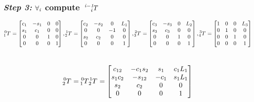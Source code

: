 \documentclass[10pt]{article}
\begin{document}
\subsubsection*{\textit{\textbf{Step 3: }}$\bf{\it{\forall_{i}}}$ compute $\bf{\it{ \tensor*[^{i-1}_{i}]{T}{}}}$}
\[
\tensor*[^{0}_{1}]{T}{} =
\begin{bmatrix}
    c_{1}        & -s_{1}       & 0     & 0      \\
    s_{1}        & c_{1}        & 0     & 0      \\
    0            & 0            & 1     & 0      \\
    0            & 0            & 0     & 1
\end{bmatrix}, 
\tensor*[^{1}_{2}]{T}{} =
\begin{bmatrix}
    c_{2}        & -s_{2}       & 0     & L_{1}  \\
    0            & 0            & -1    & 0      \\
    s_{2}        & c_{2}        & 0     & 0      \\
    0            & 0            & 0     & 1
\end{bmatrix}, 
\tensor*[^{2}_{3}]{T}{} =
\begin{bmatrix}
    c_{3}        & -s_{3}       & 0     & L_{2}  \\
    s_{3}        & c_{3}        & 0     & 0      \\
    0            & 0            & 1     & 0      \\
    0            & 0            & 0     & 1
\end{bmatrix},
\tensor*[^{3}_{4}]{T}{} =
\begin{bmatrix}
    1            & 0            & 0     & L_{3}  \\
    0            & 1            & 0     & 0      \\
    0            & 0            & 1     & 0      \\
    0            & 0            & 0     & 1
\end{bmatrix}\] \\
\[
\tensor*[^{0}_{2}]{T}{} = 
\tensor*[^{0}_{1}]{T}{} \tensor*[^{1}_{2}]{T}{} = 
\begin{bmatrix}
    c_{12}       & -c_{1}s_{2}  & s_{1} & c_{1}L_{1}     \\
    s_{1}c_{2}   & -s_{12}      & -c_{1}& s_{1}L_{1}     \\
    s_{2}        & c_{2}        & 0     & 0      \\
    0            & 0            & 0     & 1
\end{bmatrix}
\] \\
\end{document}
